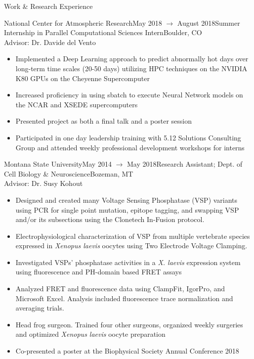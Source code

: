 \documentclass{resume} %
\begin{document}
\begin{rSection}{Work \& Research Experience}
\begin{rSubsection}{National Center for Atmospheric Research}{May 2018 $\to$ August 2018}{Summer Internship in Parallel Computational Sciences Intern}{Boulder, CO}\\
Advisor: Dr. Davide del Vento
\begin{itemize}
    \renewcommand\labelitemi{\textbullet}
    \setlength \itemsep{-0.4em}
    \item Implemented a Deep Learning approach to predict abnormally hot days over long-term time scales (20-50 days) utilizing HPC techniques on the NVIDIA K80 GPUs on the Cheyenne Supercomputer
    \item Increased proficiency in using sbatch to execute Neural Network models on the NCAR and XSEDE supercomputers
    \item Presented project as both a final talk and a poster session
    \item Participated in one day leadership training with 5.12 Solutions Consulting Group and attended weekly professional development workshops for interns
\end{itemize}
\end{rSubsection}
\begin{rSubsection}{Montana State University}{May 2014 $\to$ May 2018}{Research Assistant; Dept. of Cell Biology \& Neuroscience}{Bozeman, MT}\\
Advisor: Dr. Susy Kohout
\begin{itemize}
    \setlength \itemsep{-0.4em}
    \item Designed and created many Voltage Sensing Phosphatase (VSP) variants using PCR for single point mutation, epitope tagging, and swapping VSP and/or its subsections using the Clonetech In-Fusion protocol.
    \item Electrophysiological characterization of VSP from multiple vertebrate species expressed in \textit{Xenopus laevis} oocytes using Two Electrode Voltage Clamping.
    \item Investigated VSPs' phosphatase activities in a \textit{X. laevis} expression system using fluorescence and PH-domain based FRET assays
    \item Analyzed FRET and fluorescence data using ClampFit, IgorPro, and Microsoft Excel. Analysis included fluorescence trace normalization and averaging trials.
    \item Head frog surgeon. Trained four other surgeons, organized weekly surgeries and optimized \textit{Xenopus laevis} oocyte preparation
    \item Co-presented a poster at the Biophysical Society Annual Conference 2018
    \end{itemize}
\end{rSubsection}


\end{rSection}
\end{document}
